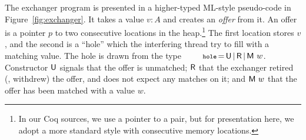 The exchanger program is presented in a higher-typed ML-style
pseudo-code in Figure~\ref{fig:exchanger}. It takes a value $v : A$
and creates an \emph{offer} from it. An offer is a pointer $p$ to two
consecutive locations in the heap.\footnote{In our Coq sources, we use
  a pointer to a pair, but for presentation here, we adopt a more
  standard style with consecutive memory locations.} The first
location stores $v$, and the second is a ``hole'' which the
interfering thread try to fill with a matching value. The hole is
drawn from the type
$\esc{hole}\,{=}\,\Unmatched\,{\mid}\,\Retired\,{\mid}\,\Matched
w$. Constructor ${\mathsf{U}}$ signals that the offer is unmatched;
${\mathsf{R}}$ that the exchanger retired (\ie, withdrew) the offer, and
does not expect any matches on it; and ${\mathsf{M}\ w}$ that the offer has
been matched with a value $w$.

